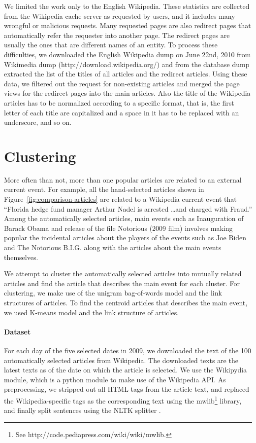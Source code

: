 \documentclass[11pt]{article}
\newcommand{\war}[1]{{\sf\small #1}}
\begin{document}
We limited the work only to the English Wikipedia.
These statistics are collected from the Wikipedia cache server as requested by users, and it includes many wrongful or malicious requests.
Many requested pages are also redirect pages that automatically refer the requester into another page.
The redirect pages are usually the ones that are different names of an entity.
To process these difficulties, we downloaded the English Wikipedia dump on June 22nd, 2010 from Wikimedia dump (http://download.wikipedia.org/) and from the database dump extracted the list of the titles of all articles and the redirect articles.
Using these data, we filtered out the request for non-existing articles and merged the page views for the redirect pages into the main articles.
Also the title of the Wikipedia articles has to be normalized according to a specific format, that is, the first letter of each title are capitalized and a space in it has to be replaced with an underscore, and so on.

\section{Clustering}
\label{ssec:clustering}

More often than not, more than one popular articles are related to an external current event.
For example, all the hand-selected articles shown in Figure~\ref{fig:comparison-articles}
are related to a Wikipedia current event that ``Florida hedge fund manager Arthur Nadel is arrested \ldots and charged with Fraud.''
Among the automatically selected articles, main events such as \war{Inauguration of Barack Obama} and release of the file \war{Notorious (2009 film)} involves making popular the incidental articles about the players of the events such as \war{Joe Biden} and \war{The Notorious B.I.G.} along with the articles about the main events themselves.

We attempt to cluster the automatically selected articles into mutually related articles and find the article that describes the main event for each cluster. For clustering, we make use of the unigram bag-of-words model and the link structures of articles. To find the centroid articles that describes the main event, we used K-means model and the link structure of articles.

\paragraph{Dataset} For each day of the five selected dates in 2009,
we downloaded the text of the 100 automatically selected articles from Wikipedia.
The downloaded texts are the latest texts as of the date on which the article is selected.
We use the Wikipydia module, which is a python module to make use of the Wikipedia API.
As preprocessing, we stripped out all HTML tags from the article text, and
replaced the Wikipedia-specific tags as the corresponding text using the mwlib\footnote{See http://code.pediapress.com/wiki/wiki/mwlib.} library,
and finally split sentences using the NLTK splitter \cite{Loper02NLTK}.
\end{document}
